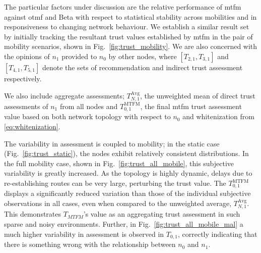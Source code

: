 The particular factors under discussion are the relative performance of \gls{mtfm} against \gls{otmf} and Beta with respect to statistical stability across mobilities and in responsiveness to changing network behaviour. 
We establish a similar result set by initially tracking the resultant trust values established by \gls{mtfm} in the pair of mobility scenarios, shown in Fig.~\ref{fig:trust_mobility}.
We are also concerned with the opinions of $n_1$ provided to $n_0$ by other nodes, where $[T_{2,1},T_{3,1}]$ and $[T_{4,1},T_{5,1}]$ denote the sets of recommendation and indirect trust assessment respectively.

We also include aggregate assessments; $T_{N,1}^\text{Avg}$, the unweighted mean of direct trust assessments of $n_1$ from all nodes and $T_{0,1}^\text{MTFM}$, the final \gls{mtfm} trust assessment value based on both network topology with respect to $n_0$ and whitenization from \eqref{eq:whitenization}.

The variability in assessment is coupled to mobility; in the static case (Fig.~\ref{fig:trust_static}), the nodes exhibit relatively consistent distributions.
In the full mobility case, shown in Fig.~\ref{fig:trust_all_mobile}, this subjective variability is greatly increased. 
As the topology is highly dynamic, delays due to re-establishing routes can be very large, perturbing the trust value.
The $T_{0,1}^\text{MTFM}$ displays a significantly reduced variation than those of the individual subjective observations in all cases, even when compared to the unweighted average, $T_{N,1}^\text{Avg}$.
This demonstrates $T_{MTFM}$'s value as an aggregating trust assessment in such sparse and noisy environments.
Further, in Fig.~\ref{fig:trust_all_mobile_mal} a much higher variability in assessment is observed in $T_{0,1}$, correctly indicating that there is something wrong with the relationship between $n_0$ and $n_1$.


